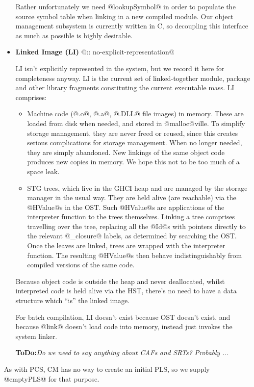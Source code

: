\documentclass[11pt]{article}
\newcommand{\ToDo}[1]{{{\bf ToDo:}\sl #1}}
\begin{document}
\begin{itemize}
  Rather unfortunately we need @lookupSymbol@ in order to populate the
  source symbol table when linking in a new compiled module.  Our
  object management subsystem is currently written in C, so decoupling
  this interface as much as possible is highly desirable.

\item
   {\bf Linked Image (LI)} @:: no-explicit-representation@

   LI isn't explicitly represented in the system, but we record it
   here for completeness anyway.  LI is the current set of
   linked-together module, package and other library fragments
   constituting the current executable mass.  LI comprises:
   \begin{itemize}
   \item Machine code (@.o@, @.a@, @.DLL@ file images) in memory.
         These are loaded from disk when needed, and stored in
         @malloc@ville.  To simplify storage management, they are
         never freed or reused, since this creates serious
         complications for storage management.  When no longer needed,
         they are simply abandoned.  New linkings of the same object
         code produces new copies in memory.  We hope this not to be
         too much of a space leak.
   \item STG trees, which live in the GHCI heap and are managed by the
         storage manager in the usual way.  They are held alive (are 
         reachable) via the @HValue@s in the OST.  Such @HValue@s are
         applications of the interpreter function to the trees
         themselves.  Linking a tree comprises travelling over the 
         tree, replacing all the @Id@s with pointers directly to the
         relevant @_closure@ labels, as determined by searching the
         OST.  Once the leaves are linked, trees are wrapped with the
         interpreter function.  The resulting @HValue@s then behave
         indistinguishably from compiled versions of the same code.
   \end{itemize}
   Because object code is outside the heap and never deallocated,
   whilst interpreted code is held alive via the HST, there's no need
   to have a data structure which ``is'' the linked image.

   For batch compilation, LI doesn't exist because OST doesn't exist,
   and because @link@ doesn't load code into memory, instead just
   invokes the system linker.

   \ToDo{Do we need to say anything about CAFs and SRTs?  Probably ...}
\end{itemize}
As with PCS, CM has no way to create an initial PLS, so we supply
@emptyPLS@ for that purpose.
\end{document}
